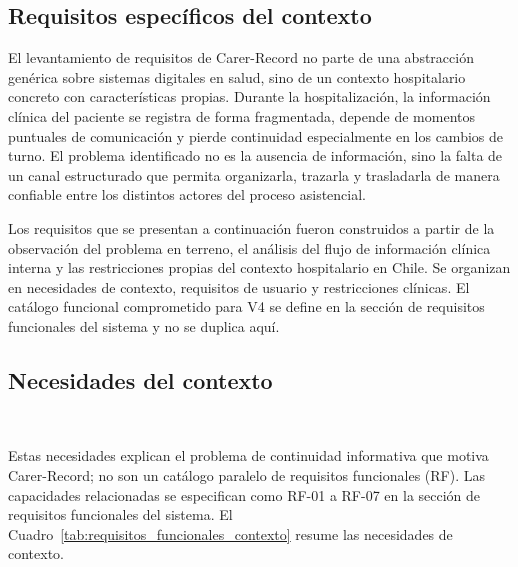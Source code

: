 \subsection{Requisitos específicos del contexto}

El levantamiento de requisitos de Carer-Record no parte de una abstracción genérica sobre sistemas digitales en salud, sino de un contexto hospitalario concreto con características propias. Durante la hospitalización, la información clínica del paciente se registra de forma fragmentada, depende de momentos puntuales de comunicación y pierde continuidad especialmente en los cambios de turno. El problema identificado no es la ausencia de información, sino la falta de un canal estructurado que permita organizarla, trazarla y trasladarla de manera confiable entre los distintos actores del proceso asistencial.

Los requisitos que se presentan a continuación fueron construidos a partir de la observación del problema en terreno, el análisis del flujo de información clínica interna y las restricciones propias del contexto hospitalario en Chile. Se organizan en necesidades de contexto, requisitos de usuario y restricciones clínicas. El catálogo funcional comprometido para V4 se define en la sección de requisitos funcionales del sistema y no se duplica aquí.

\subsection*{Necesidades del contexto}~

Estas necesidades explican el problema de continuidad informativa que motiva Carer-Record; no son un catálogo paralelo de requisitos funcionales (RF). Las capacidades relacionadas se especifican como RF-01 a RF-07 en la sección de requisitos funcionales del sistema. El Cuadro~\ref{tab:requisitos_funcionales_contexto} resume las necesidades de contexto.

